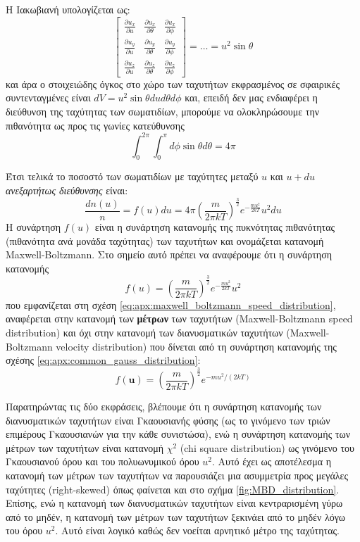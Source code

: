 Η Ιακωβιανή υπολογίζεται ως:
\begin{equation*}
\displaystyle 
    \begin{bmatrix}
      \frac{\partial u_x}{\partial u} & 
        \frac{\partial u_x}{\partial \theta} & 
        \frac{\partial u_x}{\partial \phi} \\[2ex] %
      \frac{\partial u_y}{\partial u} & 
        \frac{\partial u_y}{\partial \theta} & 
        \frac{\partial u_y}{\partial \phi} \\[2ex]
      \frac{\partial u_z}{\partial u} & 
        \frac{\partial u_z}{\partial \theta} & 
        \frac{\partial u_z}{\partial \phi}
\end{bmatrix}
= \dots = u^2 \sin{\theta}
\end{equation*}
και άρα ο στοιχειώδης όγκος στο χώρο των ταχυτήτων εκφρασμένος σε σφαιρικές συντενταγμένες είναι $dV = u^2 \sin{\theta} du d\theta d\phi$ και, επειδή δεν μας ενδιαφέρει η διεύθυνση της ταχύτητας των σωματιδίων, μπορούμε να ολοκληρώσουμε την πιθανότητα ως προς τις γωνίες κατεύθυνσης
$$\int_{0}^{2\pi} \int_{0}^{\pi} d\phi \sin{\theta} d\theta = 4 \pi$$

Έτσι τελικά το ποσοστό των σωματιδίων με ταχύτητες μεταξύ $u$ και $u+du$ \textit{ανεξαρτήτως διεύθυνσης} είναι:
\begin{equation}
    \label{eq:apx:maxwell_boltzmann_speed_distribution}
    \frac{dn(u)}{n} = f(u) du = 4\pi \left(\frac{m}{2\pi kT}\right)^{\frac{3}{2}} e^{-\frac{mu^2}{2kT}} u^2 du
\end{equation}
Η συνάρτηση $f(u)$ είναι η συνάρτηση κατανομής της πυκνότητας πιθανότητας (πιθανότητα ανά μονάδα ταχύτητας) των ταχυτήτων και ονομάζεται κατανομή Maxwell-Boltzmann. Στο σημείο αυτό πρέπει να αναφέρουμε ότι η συνάρτηση κατανομής 
$$ f(u) = \left(\frac{m}{2\pi kT}\right)^{\frac{3}{2}} e^{-\frac{mu^2}{2kT}} u^2 $$
που εμφανίζεται στη σχέση \eqref{eq:apx:maxwell_boltzmann_speed_distribution}, αναφέρεται στην κατανομή των \textbf{μέτρων} των ταχυτήτων (Maxwell-Boltzmann speed distribution) και όχι στην κατανομή των διανυσματικών ταχυτήτων (Maxwell-Boltzmann velocity distribution) που δίνεται από τη συνάρτηση κατανομής της σχέσης \eqref{eq:apx:common_gauss_distribution}:
$$f(\boldsymbol{u}) = \left(\frac{m}{2\pi kT}\right)^{\frac{3}{2}} e^{- mu^2/(2kT)}$$

Παρατηρώντας τις δύο εκφράσεις, βλέπουμε ότι η συνάρτηση κατανομής των διανυσματικών ταχυτήτων είναι Γκαουσιανής φύσης (ως το γινόμενο των τριών επιμέρους Γκαουσιανών για την κάθε συνιστώσα), ενώ η συνάρτηση κατανομής των μέτρων των ταχυτήτων είναι κατανομή $\chi^2$ (chi square distribution) ως γινόμενο του Γκαουσιανού όρου και του πολυωνυμικού όρου $u^2$. Αυτό έχει ως αποτέλεσμα η κατανομή των μέτρων των ταχυτήτων να παρουσιάζει μια ασυμμετρία προς μεγάλες ταχύτητες (right-skewed) όπως φαίνεται και στο σχήμα \ref{fig:MBD_distribution}. Επίσης, ενώ η κατανομή των διανυσματικών ταχυτήτων είναι κεντραρισμένη γύρω από το μηδέν, η κατανομή των μέτρων των ταχυτήτων ξεκινάει από το μηδέν λόγω του όρου $u^2$. Αυτό είναι λογικό καθώς δεν νοείται αρνητικό μέτρο της ταχύτητας.


